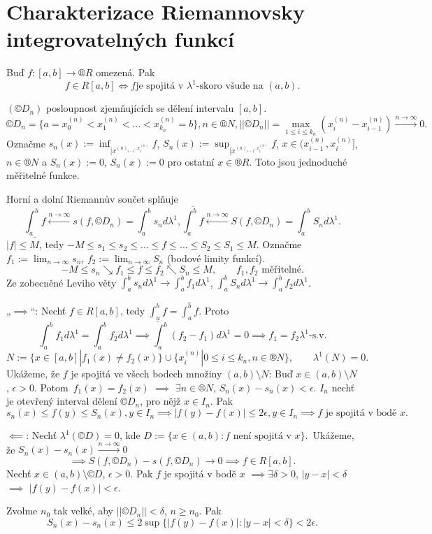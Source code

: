 \documentclass[12pt]{article}					%
\begin{document}
\section{Charakterizace Riemannovsky integrovatelných funkcí}
\begin{veta}
	Buď $f: [a, b] \rightarrow ®R$ omezená. Pak
	$$ f \in R[a, b] \Leftrightarrow f \text{je spojitá v $\lambda^1$-skoro všude na $(a, b)$}. $$

	\begin{dukazin}
		$(©D_n)$ posloupnost zjemňujících se dělení intervalu $[a, b]$.
		$$ ©D_n = \{a = x_0^{(n)} < x_1^{(n)} < … < x_{k_n}^{(n)} = b\}, n \in ®N, ||©D_n|| = \max_{1 ≤ i ≤ k_n} (x_i^{(n)} - x_{i-1}^{(n)}) \stackrel{n \rightarrow ∞}{\rightarrow} 0. $$
		Označme $s_n(x) := \inf_{[x^{(n)_{i-1}, x_i^{(n)}}} f$, $S_n(x) := \sup_{[x^{(n)_{i-1}, x_i^{(n)}}} f$, $x \in (x_{i-1}^{(n)}, x_i^{(n)}]$, $n \in ®N$ a $S_n(x) := 0$, $S_n(x):= 0$ pro ostatní $x \in ®R$. Toto jsou jednoduché měřitelné funkce.

		Horní a dolní Riemannův součet splňuje
		$$ \underline{\int_a^b f} \stackrel{n \rightarrow ∞}{\leftarrow} s(f, ©D_n) = \int_a^b s_n d\lambda^1, \overline{\int_a^b f} \stackrel{n \rightarrow ∞}{\leftarrow} S(f, ©D_n) = \int_a^b S_n d\lambda^1. $$
		$|f| ≤ M$, tedy $-M ≤ s_1 ≤ s_2 ≤ … ≤ f ≤ … ≤ S_2 ≤ S_1 ≤ M$. Označme $f_1 := \lim_{n \rightarrow ∞} s_n$, $f_2 := \lim_{n \rightarrow ∞} S_n$ (bodové limity funkcí).
		$$ -M ≤ s_n \searrow f_1 ≤ f ≤ f_2 \nwarrow S_n ≤ M, \qquad f_1, f_2 \text{ měřitelné}. $$
		Ze zobecněné Leviho věty $\int_a^b s_n d\lambda^1 \rightarrow \int_a^b f_1 d\lambda^1$, $\int_a^b S_n d\lambda^1 \rightarrow \int_a^b f_2 d \lambda^1$.

		„$\implies$“: Nechť $f \in R[a, b]$, tedy $\underline{\int_a^b f} = \overline{\int_a^b f}$. Proto
		$$ \int_a^b f_1 d\lambda^1 = \int_a^b f_2 d \lambda^1 \implies \int_a^b (f_2 - f_1) d\lambda^1 = 0 \implies f_1 = f_2 \lambda^1\text{-s.v.} $$
		$$ N := \{x \in [a, b] | f_1(x) ≠ f_2(x)\} \cup \{x_i^{(n)} | 0 ≤ i ≤ k_n, n \in ®N\}, \qquad \lambda^1(N) = 0. $$
		Ukážeme, že $f$ je spojitá ve všech bodech množiny $(a, b) \setminus N$: Buď $x \in (a, b) \setminus N$, $\epsilon > 0$. Potom $f_1(x) = f_2(x)$ $\implies$ $\exists n \in ®N$, $S_n(x) - s_n(x) < \epsilon$. $I_n$ nechť je otevřený interval dělení $©D_n$, pro nějž $x \in I_n$. Pak
		$$ s_n(x) ≤ f(y) ≤ S_n(x), y \in I_n \implies |f(y) - f(x)| ≤ 2\epsilon, y \in I_n \implies f \text{ je spojitá v bodě $x$.} $$

		$\impliedby$: Nechť $\lambda^1(©D) = 0$, kde $D := \{x \in (a, b): f\text{ není spojitá v }x\}$. Ukážeme, že $S_n(x) - s_n(x) \stackrel{n \rightarrow ∞}{\rightarrow} 0$
		$$ \implies S(f, ©D_n) - s(f, ©D_n) \rightarrow 0 \implies f \in R[a, b]. $$
		Nechť $x \in (a, b) \setminus ©D$, $\epsilon > 0$. Pak $f$ je spojitá v bodě $x$ $\implies \exists \delta > 0$, $|y - x| < \delta$ $\implies$ $|f(y) - f(x)| < \epsilon$.

		Zvolme $n_0$ tak velké, aby $||©D_n|| < \delta$, $n ≥ n_0$. Pak 
		$$ S_n(x) - s_n(x) ≤ 2 \sup\{|f(y) - f(x)|: |y - x| < \delta\} < 2\epsilon. $$
	\end{dukazin}
\end{veta}
\end{document}
